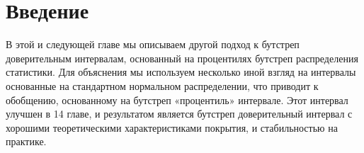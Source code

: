 \section{Введение}
В этой и следующей главе мы описываем другой подход к бутстреп доверительным интервалам, основанный на процентилях бутстреп распределения статистики. Для объяснения мы используем несколько иной взгляд на интервалы основанные на стандартном нормальном распределении, что приводит к обобщению, основанному на бутстреп «процентиль» интервале. Этот интервал улучшен в 14 главе, и результатом является бутстреп доверительный интервал с хорошими теоретическими характеристиками покрытия, и стабильностью на практике.

